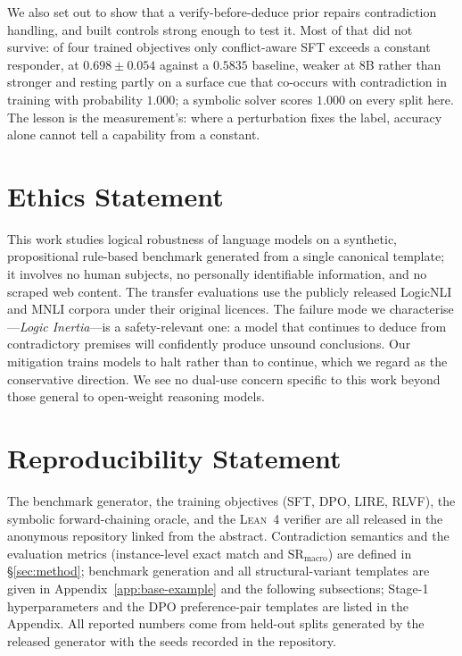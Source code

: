 \documentclass{article}
\begin{document}
We also set out to show that a verify-before-deduce prior repairs contradiction
handling, and built controls strong enough to test it. Most of that did not
survive: of four trained objectives only conflict-aware SFT exceeds a constant
responder, at $0.698 \pm 0.054$ against a $0.5835$ baseline, weaker at 8B rather
than stronger and resting partly on a surface cue that co-occurs with
contradiction in training with probability $1.000$; a symbolic solver scores
$1.000$ on every split here. The lesson is the measurement's: where a
perturbation fixes the label, accuracy alone cannot tell a capability from a
constant.

\section*{Ethics Statement}
This work studies logical robustness of language models on a synthetic, propositional
rule-based benchmark generated from a single canonical template; it involves no human
subjects, no personally identifiable information, and no scraped web content. The
transfer evaluations use the publicly released LogicNLI and MNLI corpora under their
original licences. The failure mode we characterise---\emph{Logic Inertia}---is a
safety-relevant one: a model that continues to deduce from contradictory premises will
confidently produce unsound conclusions. Our mitigation trains models to halt rather
than to continue, which we regard as the conservative direction. We see no dual-use
concern specific to this work beyond those general to open-weight reasoning models.

\section*{Reproducibility Statement}
The benchmark generator, the training objectives (SFT, DPO, LIRE, \textsc{RLVF}), the
symbolic forward-chaining oracle, and the \textsc{Lean~4} verifier are all released in
the anonymous repository linked from the abstract. Contradiction semantics and the
evaluation metrics (instance-level exact match and $\mathrm{SR}_{\text{macro}}$) are
defined in \S\ref{sec:method}; benchmark generation and all structural-variant
templates are given in Appendix~\ref{app:base-example} and the following subsections;
Stage-1 hyperparameters and the DPO preference-pair templates are listed in the
Appendix. All reported numbers come from held-out splits generated by the released
generator with the seeds recorded in the repository.
\end{document}
